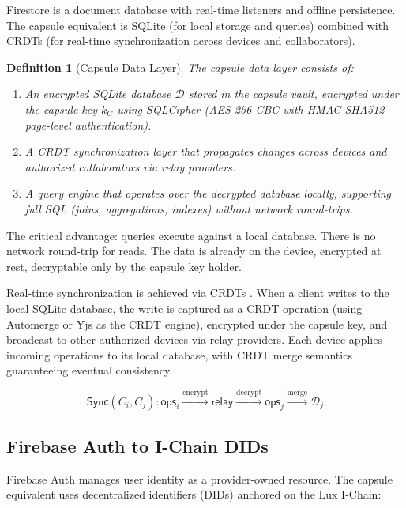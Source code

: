 \documentclass[11pt,a4paper]{article}
\newtheorem{definition}{Definition}
\begin{document}
Firestore is a document database with real-time listeners and
offline persistence. The capsule equivalent is SQLite (for local
storage and queries) combined with CRDTs (for real-time
synchronization across devices and collaborators).

\begin{definition}[Capsule Data Layer]
The capsule data layer consists of:
\begin{enumerate}
    \item An encrypted SQLite database $\mathcal{D}$ stored in the capsule
    vault, encrypted under the capsule key $k_C$ using SQLCipher
    \cite{zetetic2024sqlcipher} (AES-256-CBC with HMAC-SHA512 page-level
    authentication).
    \item A CRDT synchronization layer that propagates changes across
    devices and authorized collaborators via relay providers.
    \item A query engine that operates over the decrypted database locally,
    supporting full SQL (joins, aggregations, indexes) without network
    round-trips.
\end{enumerate}
\end{definition}

The critical advantage: queries execute against a local database. There
is no network round-trip for reads. The data is already on the device,
encrypted at rest, decryptable only by the capsule key holder.

Real-time synchronization is achieved via CRDTs \cite{shapiro2011crdt}.
When a client writes to the local SQLite database, the write is captured
as a CRDT operation (using Automerge \cite{kleppmann2017automerge} or
Yjs \cite{nicolaescu2015yjs} as the CRDT engine), encrypted under the
capsule key, and broadcast to other authorized devices via relay providers.
Each device applies incoming operations to its local database, with CRDT
merge semantics guaranteeing eventual consistency.

\begin{equation}
    \mathsf{Sync}(C_i, C_j) : \mathsf{ops}_i \xrightarrow{\text{encrypt}} \mathsf{relay} \xrightarrow{\text{decrypt}} \mathsf{ops}_j \xrightarrow{\text{merge}} \mathcal{D}_j
\end{equation}

\subsection{Firebase Auth to I-Chain DIDs}

Firebase Auth manages user identity as a provider-owned resource. The
capsule equivalent uses decentralized identifiers (DIDs) anchored on
the Lux I-Chain:
\end{document}
